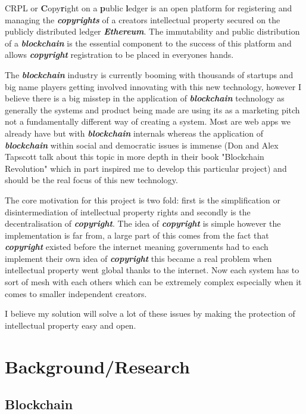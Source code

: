 \documentclass[12pt]{article}
\newcommand{\keyword}[1]{\textbf{\textit{#1}}}
\begin{document}
CRPL or \textbf{C}opy\textbf{r}ight on a \textbf{p}ublic \textbf{l}edger is an open platform for registering and managing the \keyword{copyrights} of a creators intellectual property secured on the publicly distributed ledger \keyword{Ethereum}. The immutability and public distribution of a \keyword{blockchain} is the essential component to the success of this platform and allows \keyword{copyright} registration to be placed in everyones hands.

The \keyword{blockchain} industry is currently booming with thousands of startups and big name players getting involved innovating with this new technology, however I believe there is a big misstep in the application of \keyword{blockchain} technology as generally the systems and product being made are using its as a marketing pitch not a fundamentally different way of creating a system. Most are web apps we already have but with \keyword{blockchain} internals whereas the application of \keyword{blockchain} within social and democratic issues is immense (Don and Alex Tapscott talk about this topic in more depth in their book "Blockchain Revolution"\cite{blockchain_revolution} which in part inspired me to develop this particular project) and should be the real focus of this new technology.

The core motivation for this project is two fold: first is the simplification or disintermediation of intellectual property rights and secondly is the decentralisation of \keyword{copyright}. The idea of \keyword{copyright} is simple however the implementation is far from, a large part of this comes from the fact that \keyword{copyright} existed before the internet meaning governments had to each implement their own idea of \keyword{copyright} this became a real problem when intellectual property went global thanks to the internet. Now each system has to sort of mesh with each others which can be extremely complex especially when it comes to smaller independent creators.

I believe my solution will solve a lot of these issues by making the protection of intellectual property easy and open.

\section{Background/Research}

\subsection{Blockchain}
\end{document}

